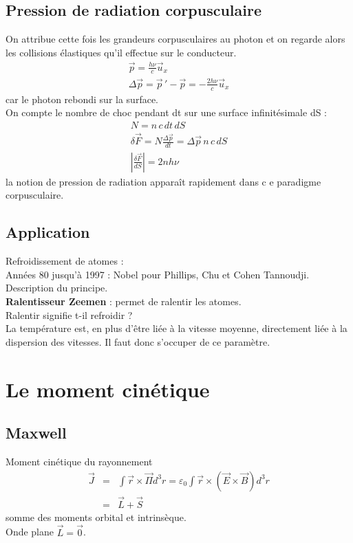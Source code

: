 \documentclass[12pt,prb,aps,epsf]{article}
\begin{document}
\subsection{Pression de radiation corpusculaire}
On attribue cette fois les grandeurs corpusculaires au photon et on regarde alors les collisions élastiques qu'il effectue sur le conducteur.
\begin{eqnarray}
\vec{p} = \frac{h\nu}{c}\vec{u}_x\\
\Delta \vec{p} = \vec{p}\,' - \vec{p} = -\frac{2h\nu}{c}\vec{u}_x
\end{eqnarray}
car le photon rebondi sur la surface.\\
On compte le nombre de choc pendant dt sur une surface infinitésimale dS :
\begin{eqnarray}
N = n\,c\,dt\,dS\\
\delta \vec{F} = N \frac{\Delta \vec{p}}{dt} = \Delta \vec{p}\, n\, c\, dS\\
\left|\frac{\delta \vec{F}}{dS}\right| = 2 n h \nu
\end{eqnarray}
la notion de pression de radiation apparaît rapidement dans c e paradigme corpusculaire.

\subsection{Application}
Refroidissement de atomes :\\
Années 80 jusqu'à 1997 : Nobel pour Phillips, Chu et Cohen Tannoudji.\\
Description du principe.\\

\textbf{Ralentisseur Zeemen} : permet de ralentir les atomes.\\

Ralentir signifie t-il refroidir ?\\
La température est, en plus d'être liée à la vitesse moyenne, directement liée à la dispersion des vitesses. Il faut donc s'occuper de ce paramètre.

\section{Le moment cinétique}
\subsection{Maxwell}
Moment cinétique du rayonnement 
\begin{eqnarray}
\vec{J} &=& \int \vec{r}\times\vec{\Pi} d^3r = \varepsilon_0 \int \vec{r}\times (\vec{E}\times\vec{B})d^3r\\
&=& \vec{L} + \vec{S}
\end{eqnarray}
somme des moments orbital et intrinsèque.\\
Onde plane $\vec{L} = \vec{0}$.
\end{document}
